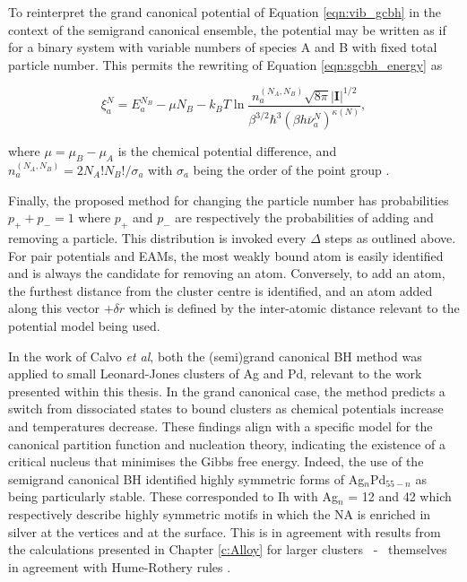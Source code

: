 To reinterpret the grand canonical potential of Equation \ref{eqn:vib_gcbh} in the context of the semigrand canonical ensemble, the potential may be written as if for a binary system with variable numbers of species A and B with fixed total particle number. This permits the rewriting of Equation \ref{eqn:sgcbh_energy} as 

\begin{equation}
    \xi_{a}^{N} = E_{a}^{N_{B}} - \mu N_{B} - k_{B}T\ln{ \frac{ n_{a}^{(N_{A}, N_{B})}\sqrt{8\pi}|\textbf{I}|^{1/2} } { \beta^{3/2}\hbar^{3}\left( \beta h \overline{\nu}_{a}^{N} \right)^{\kappa(N)} } },
    \label{eqn:sgcbh_energy_semi}
\end{equation}

where $\mu = \mu_{B} - \mu_{A}$ is the chemical potential difference, and $n_{a}^{(N_{A}, N_{B})} = 2N_{A}!N_{B}!/\sigma_{a}$ with $\sigma_{a}$ being the order of the point group \cite{C4NR02670E}. 

Finally, the proposed method for changing the particle number has probabilities $p_{+} + p_{-} = 1$ where $p_{+}$ and $p_{-}$ are respectively the probabilities of adding and removing a particle. This distribution is invoked every $\Delta$ steps as outlined above. For pair potentials and EAMs, the most weakly bound atom is easily identified and is always the candidate for removing an atom. Conversely, to add an atom, the furthest distance from the cluster centre is identified, and an atom added along this vector $+\delta r$ which is defined by the inter-atomic distance relevant to the potential model being used. 

In the work of Calvo \textit{et al}, \cite{doi:10.1021/acs.jctc.5b00962} both the (semi)grand canonical BH method was applied to small Leonard-Jones clusters of Ag and Pd, relevant to the work presented within this thesis. In the grand canonical case, the method predicts a switch from dissociated states to bound clusters as chemical potentials increase and temperatures decrease. These findings align with a specific model for the canonical partition function and nucleation theory, indicating the existence of a critical nucleus that minimises the Gibbs free energy. Indeed, the use of the semigrand canonical BH identified highly symmetric forms of Ag$_{n}$Pd$_{55-n}$ as being particularly stable. These corresponded to Ih with Ag$_{n}$ = 12 and 42 which respectively describe highly symmetric motifs in which the NA is enriched in silver at the vertices and at the surface. This is in agreement with results from the calculations presented in Chapter \ref{c:Alloy} for larger clusters ~-~ themselves in agreement with Hume-Rothery rules \cite{Hume_Rothery_Rule1,Hume_Rothery_Rule2,Hume_Rothery_Rule3,Hume_Rothery_Rule4}.

